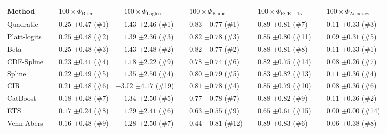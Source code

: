 \begin{tabular}{llllll}
\toprule
Method & $\phantom{-} 100 \times \Phi_\mathrm{Brier}$ & $\phantom{-} 100 \times \Phi_\mathrm{Logloss}$ & $\phantom{-} 100 \times \Phi_\mathrm{Kuiper}$ & $\phantom{-} 100 \times \Phi_\mathrm{ECE-15}$ & $\phantom{-} 100 \times \Phi_\mathrm{Accuracy}$ \\
\midrule
Quadratic & $\phantom{-}0.25$ {\tiny $\pm 0.47$} (\#1) & $\phantom{-}1.43$ {\tiny $\pm 2.46$} (\#1) & $\phantom{-}0.83$ {\tiny $\pm 0.77$} (\#1) & $\phantom{-}0.89$ {\tiny $\pm 0.81$} (\#7) & $\phantom{-}0.11$ {\tiny $\pm 0.33$} (\#3) \\
Platt-logits & $\phantom{-}0.25$ {\tiny $\pm 0.48$} (\#2) & $\phantom{-}1.39$ {\tiny $\pm 2.36$} (\#3) & $\phantom{-}0.82$ {\tiny $\pm 0.78$} (\#3) & $\phantom{-}0.85$ {\tiny $\pm 0.80$} (\#11) & $\phantom{-}0.09$ {\tiny $\pm 0.31$} (\#5) \\
Beta & $\phantom{-}0.25$ {\tiny $\pm 0.48$} (\#3) & $\phantom{-}1.43$ {\tiny $\pm 2.48$} (\#2) & $\phantom{-}0.82$ {\tiny $\pm 0.77$} (\#2) & $\phantom{-}0.88$ {\tiny $\pm 0.81$} (\#8) & $\phantom{-}0.11$ {\tiny $\pm 0.33$} (\#1) \\
CDF-Spline & $\phantom{-}0.23$ {\tiny $\pm 0.41$} (\#4) & $\phantom{-}1.18$ {\tiny $\pm 2.22$} (\#9) & $\phantom{-}0.78$ {\tiny $\pm 0.74$} (\#6) & $\phantom{-}0.82$ {\tiny $\pm 0.75$} (\#14) & $\phantom{-}0.08$ {\tiny $\pm 0.26$} (\#7) \\
Spline & $\phantom{-}0.22$ {\tiny $\pm 0.49$} (\#5) & $\phantom{-}1.35$ {\tiny $\pm 2.50$} (\#4) & $\phantom{-}0.80$ {\tiny $\pm 0.79$} (\#5) & $\phantom{-}0.83$ {\tiny $\pm 0.82$} (\#13) & $\phantom{-}0.11$ {\tiny $\pm 0.36$} (\#4) \\
CIR & $\phantom{-}0.21$ {\tiny $\pm 0.48$} (\#6) & $-3.02$ {\tiny $\pm 4.17$} (\#19) & $\phantom{-}0.81$ {\tiny $\pm 0.78$} (\#4) & $\phantom{-}0.85$ {\tiny $\pm 0.79$} (\#10) & $\phantom{-}0.08$ {\tiny $\pm 0.36$} (\#6) \\
CatBoost & $\phantom{-}0.18$ {\tiny $\pm 0.48$} (\#7) & $\phantom{-}1.34$ {\tiny $\pm 2.50$} (\#5) & $\phantom{-}0.77$ {\tiny $\pm 0.78$} (\#7) & $\phantom{-}0.88$ {\tiny $\pm 0.82$} (\#9) & $\phantom{-}0.11$ {\tiny $\pm 0.36$} (\#2) \\
ETS & $\phantom{-}0.17$ {\tiny $\pm 0.24$} (\#8) & $\phantom{-}1.29$ {\tiny $\pm 2.41$} (\#6) & $\phantom{-}0.63$ {\tiny $\pm 0.55$} (\#9) & $\phantom{-}0.65$ {\tiny $\pm 0.61$} (\#15) & $\phantom{-}0.00$ {\tiny $\pm 0.00$} (\#14) \\
Venn-Abers & $\phantom{-}0.16$ {\tiny $\pm 0.48$} (\#9) & $\phantom{-}1.28$ {\tiny $\pm 2.50$} (\#7) & $\phantom{-}0.44$ {\tiny $\pm 0.81$} (\#12) & $\phantom{-}0.89$ {\tiny $\pm 0.83$} (\#6) & $\phantom{-}0.06$ {\tiny $\pm 0.38$} (\#8) \\

\end{tabular}
